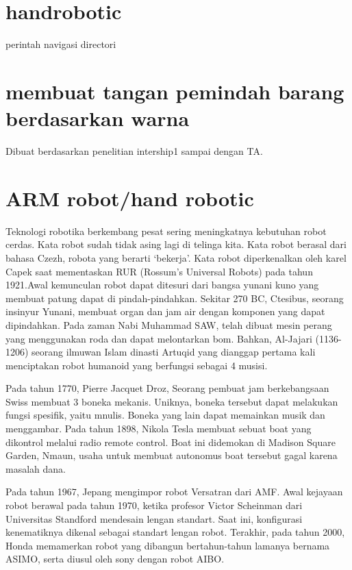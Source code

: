\section{handrobotic}
perintah navigasi directori

\section{membuat tangan pemindah barang berdasarkan warna}
Dibuat berdasarkan penelitian intership1 sampai dengan TA.

\section {ARM robot/hand robotic}
Teknologi robotika berkembang pesat sering meningkatnya kebutuhan robot cerdas. Kata robot sudah tidak asing lagi di telinga kita. Kata robot berasal dari bahasa Czezh, robota yang berarti ‘bekerja’. Kata robot diperkenalkan oleh karel Capek saat mementaskan RUR (Rossum’s Universal Robots) pada tahun 1921.Awal kemunculan robot dapat ditesuri dari bangsa yunani kuno yang membuat patung dapat di pindah-pindahkan. Sekitar 270 BC, Ctesibus, seorang insinyur Yunani, membuat organ dan jam air dengan komponen yang dapat dipindahkan. Pada zaman Nabi Muhammad SAW, telah dibuat mesin perang yang menggunakan roda dan dapat melontarkan bom. Bahkan, Al-Jajari (1136-1206) seorang ilmuwan Islam dinasti Artuqid yang dianggap pertama kali menciptakan robot humanoid yang berfungsi sebagai 4 musisi.

Pada tahun 1770, Pierre Jacquet Droz, Seorang pembuat jam berkebangsaan Swiss membuat 3 boneka mekanis. Uniknya, boneka tersebut dapat melakukan fungsi spesifik, yaitu mnulis. Boneka yang lain dapat memainkan musik dan menggambar. Pada tahun 1898, Nikola Tesla membuat sebuat boat yang dikontrol melalui radio remote control. Boat ini didemokan di Madison Square Garden, Nmaun, usaha untuk membuat autonomus boat tersebut gagal karena masalah dana.

	Pada tahun 1967, Jepang mengimpor robot Versatran dari AMF. Awal kejayaan robot berawal pada tahun 1970, ketika profesor Victor Scheinman dari Universitas Standford mendesain lengan standart. Saat ini, konfigurasi kenematiknya dikenal sebagai standart lengan robot. Terakhir, pada tahun 2000, Honda memamerkan robot yang dibangun bertahun-tahun lamanya bernama ASIMO, serta diusul oleh sony dengan robot AIBO. 
